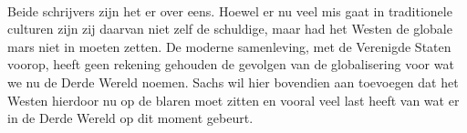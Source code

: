 \documentclass[11pt]{article}
\begin{document}
\paragraph{}

Beide schrijvers zijn het er over eens. Hoewel er nu veel mis gaat in traditionele culturen zijn zij daarvan niet zelf de schuldige, maar had het Westen de globale mars niet in moeten zetten. De moderne samenleving, met de Verenigde Staten voorop, heeft geen rekening gehouden de gevolgen van de globalisering voor wat we nu de Derde Wereld noemen. Sachs wil hier bovendien aan toevoegen dat het Westen hierdoor nu op de blaren moet zitten en vooral veel last heeft van wat er in de Derde Wereld op dit moment gebeurt.
\end{document}
